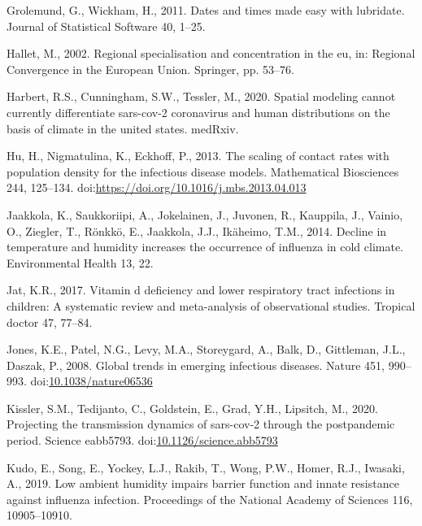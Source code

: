 \documentclass[]{elsarticle} %
\begin{document}
\leavevmode\hypertarget{ref-Grolemund2011dates}{}%
Grolemund, G., Wickham, H., 2011. Dates and times made easy with
lubridate. Journal of Statistical Software 40, 1--25.

\leavevmode\hypertarget{ref-Hallet2002regional}{}%
Hallet, M., 2002. Regional specialisation and concentration in the eu,
in: Regional Convergence in the European Union. Springer, pp. 53--76.

\leavevmode\hypertarget{ref-Harbert2020spatial}{}%
Harbert, R.S., Cunningham, S.W., Tessler, M., 2020. Spatial modeling
cannot currently differentiate sars-cov-2 coronavirus and human
distributions on the basis of climate in the united states. medRxiv.

\leavevmode\hypertarget{ref-Hu2013scaling}{}%
Hu, H., Nigmatulina, K., Eckhoff, P., 2013. The scaling of contact rates
with population density for the infectious disease models. Mathematical
Biosciences 244, 125--134.
doi:\href{https://doi.org/https://doi.org/10.1016/j.mbs.2013.04.013}{https://doi.org/10.1016/j.mbs.2013.04.013}

\leavevmode\hypertarget{ref-Jaakkola2014decline}{}%
Jaakkola, K., Saukkoriipi, A., Jokelainen, J., Juvonen, R., Kauppila,
J., Vainio, O., Ziegler, T., Rönkkö, E., Jaakkola, J.J., Ikäheimo, T.M.,
2014. Decline in temperature and humidity increases the occurrence of
influenza in cold climate. Environmental Health 13, 22.

\leavevmode\hypertarget{ref-Jat2017vitamin}{}%
Jat, K.R., 2017. Vitamin d deficiency and lower respiratory tract
infections in children: A systematic review and meta-analysis of
observational studies. Tropical doctor 47, 77--84.

\leavevmode\hypertarget{ref-Jones2008global}{}%
Jones, K.E., Patel, N.G., Levy, M.A., Storeygard, A., Balk, D.,
Gittleman, J.L., Daszak, P., 2008. Global trends in emerging infectious
diseases. Nature 451, 990--993.
doi:\href{https://doi.org/10.1038/nature06536}{10.1038/nature06536}

\leavevmode\hypertarget{ref-Kissler2020projecting}{}%
Kissler, S.M., Tedijanto, C., Goldstein, E., Grad, Y.H., Lipsitch, M.,
2020. Projecting the transmission dynamics of sars-cov-2 through the
postpandemic period. Science eabb5793.
doi:\href{https://doi.org/10.1126/science.abb5793}{10.1126/science.abb5793}

\leavevmode\hypertarget{ref-Kudo2019low}{}%
Kudo, E., Song, E., Yockey, L.J., Rakib, T., Wong, P.W., Homer, R.J.,
Iwasaki, A., 2019. Low ambient humidity impairs barrier function and
innate resistance against influenza infection. Proceedings of the
National Academy of Sciences 116, 10905--10910.
\end{document}
